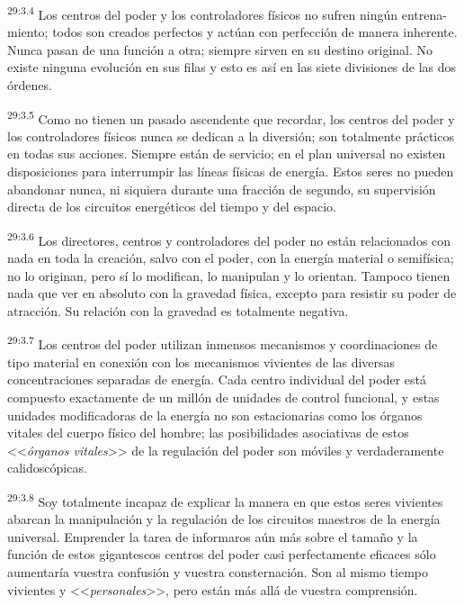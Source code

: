 \par
\textsuperscript{29:3.4} Los centros del poder y los controladores físicos no sufren ningún entrena-miento; todos son creados perfectos y actúan con perfección de manera inherente. Nunca pasan de una función a otra; siempre sirven en su destino original. No existe ninguna evolución en sus filas y esto es así en las siete divisiones de las dos órdenes.

\par
\textsuperscript{29:3.5} Como no tienen un pasado ascendente que recordar, los centros del poder y los controladores físicos nunca se dedican a la diversión; son totalmente prácticos en todas sus acciones. Siempre están de servicio; en el plan universal no existen disposiciones para interrumpir las líneas físicas de energía. Estos seres no pueden abandonar nunca, ni siquiera durante una fracción de segundo, su supervisión directa de los circuitos energéticos del tiempo y del espacio.

\par
\textsuperscript{29:3.6} Los directores, centros y controladores del poder no están relacionados con nada en toda la creación, salvo con el poder, con la energía material o semifísica; no lo originan, pero sí lo modifican, lo manipulan y lo orientan. Tampoco tienen nada que ver en absoluto con la gravedad física, excepto para resistir su poder de atracción. Su relación con la gravedad es totalmente negativa.

\par
\textsuperscript{29:3.7} Los centros del poder utilizan inmensos mecanismos y coordinaciones de tipo material en conexión con los mecanismos vivientes de las diversas concentraciones separadas de energía. Cada centro individual del poder está compuesto exactamente de un millón de unidades de control funcional, y estas unidades modificadoras de la energía no son estacionarias como los órganos vitales del cuerpo físico del hombre; las posibilidades asociativas de estos <<\textit{órganos vitales}>> de la regulación del poder son móviles y verdaderamente calidoscópicas.

\par
\textsuperscript{29:3.8} Soy totalmente incapaz de explicar la manera en que estos seres vivientes abarcan la manipulación y la regulación de los circuitos maestros de la energía universal. Emprender la tarea de informaros aún más sobre el tamaño y la función de estos gigantescos centros del poder casi perfectamente eficaces sólo aumentaría vuestra confusión y vuestra consternación. Son al mismo tiempo vivientes y <<\textit{personales}>>, pero están más allá de vuestra comprensión.

